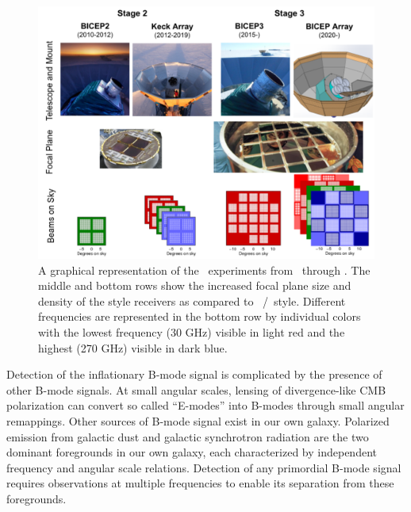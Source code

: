 \documentclass[]{spie}
\begin{document}
\begin{figure}[h]
	\center
	\includegraphics[scale=0.5]{progression.pdf}
	\caption{A graphical representation of the \bk\ experiments from
	\ through \biceparray. The middle and bottom rows show the increased focal plane size and density of the  style receivers as compared to \ /\keck\ style. Different
	frequencies are represented in the bottom row by individual colors with the lowest frequency
	(30 GHz) visible in light red and the highest (270 GHz) visible in dark
	blue.}
	\label{fig:progression}
\end{figure}

Detection of the inflationary B-mode signal is complicated by the presence of
other B-mode signals. At small angular scales, lensing of divergence-like CMB
polarization can convert so called ``E-modes'' into B-modes through small
angular remappings. Other sources of B-mode signal exist in our own galaxy.
Polarized emission from galactic dust and galactic synchrotron radiation are
the two dominant foregrounds in our own galaxy, each characterized by
independent frequency and angular scale relations. Detection of any primordial
B-mode signal requires observations at multiple frequencies to enable its
separation from these foregrounds. 
\end{document}

